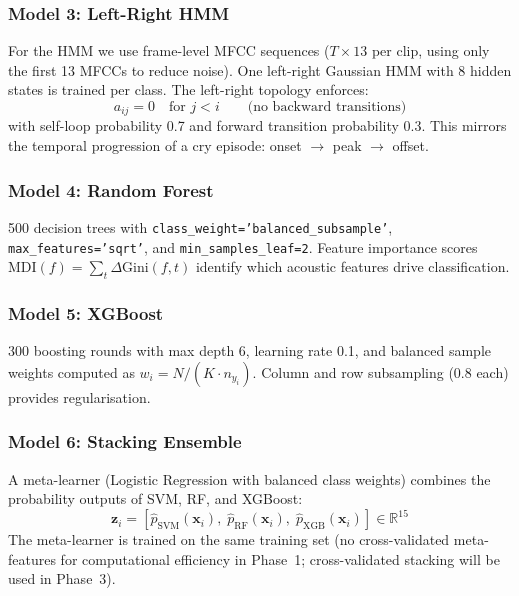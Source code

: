 \documentclass[11pt,a4paper]{article}
\begin{document}
\subsubsection{Model 3: Left-Right HMM}

For the HMM we use frame-level MFCC sequences
($T \times 13$ per clip, using only the first 13 MFCCs to reduce
noise). One left-right Gaussian HMM with 8 hidden states is trained
per class. The left-right topology enforces:
\begin{equation}
  a_{ij} = 0 \quad \text{for } j < i
  \qquad\text{(no backward transitions)}
\end{equation}
with self-loop probability 0.7 and forward transition probability 0.3.
This mirrors the temporal progression of a cry episode: onset
$\rightarrow$ peak $\rightarrow$ offset.

\subsubsection{Model 4: Random Forest}

500 decision trees with \texttt{class\_weight='balanced\_subsample'},
\texttt{max\_features='sqrt'}, and \texttt{min\_samples\_leaf=2}.
Feature importance scores $\text{MDI}(f) = \sum_t \Delta \text{Gini}(f, t)$
identify which acoustic features drive classification.

\subsubsection{Model 5: XGBoost}

300 boosting rounds with max depth 6, learning rate 0.1, and balanced
sample weights computed as $w_i = N / (K \cdot n_{y_i})$. Column and
row subsampling (0.8 each) provides regularisation.

\subsubsection{Model 6: Stacking Ensemble}

A meta-learner (Logistic Regression with balanced class weights)
combines the probability outputs of SVM, RF, and XGBoost:
\begin{equation}
  \mathbf{z}_i = [\hat{p}_{\text{SVM}}(\mathbf{x}_i),\;
                   \hat{p}_{\text{RF}}(\mathbf{x}_i),\;
                   \hat{p}_{\text{XGB}}(\mathbf{x}_i)] \in \mathbb{R}^{15}
\end{equation}
The meta-learner is trained on the same training set (no cross-validated
meta-features for computational efficiency in Phase~1; cross-validated
stacking will be used in Phase~3).
\end{document}
